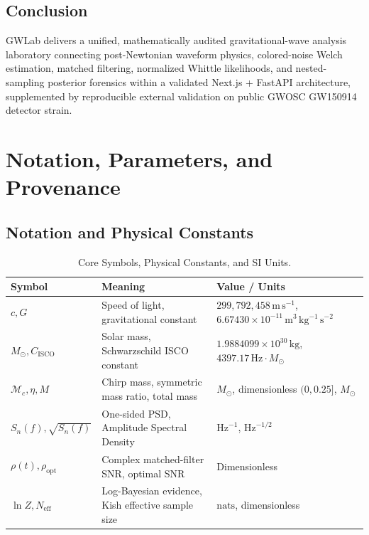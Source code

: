 \documentclass[11pt,a4paper]{report}
\begin{document}
\section{Conclusion}
GWLab delivers a unified, mathematically audited gravitational-wave analysis laboratory connecting post-Newtonian waveform physics, colored-noise Welch estimation, matched filtering, normalized Whittle likelihoods, and nested-sampling posterior forensics within a validated Next.js + FastAPI architecture, supplemented by reproducible external validation on public GWOSC GW150914 detector strain.

\appendix

\chapter{Notation, Parameters, and Provenance}\label{app:provenance}

\section{Notation and Physical Constants}
\begin{table}[H]
    \centering
    \caption{Core Symbols, Physical Constants, and SI Units.}
    \small
    \begin{tabular}{p{3.0cm}p{5.0cm}p{6.8cm}}
        \toprule
        \textbf{Symbol} & \textbf{Meaning} & \textbf{Value / Units} \\
        \midrule
        $c, G$ & Speed of light, gravitational constant & $299{,}792{,}458\,\mathrm{m\,s^{-1}}$, $6.67430\times 10^{-11}\,\mathrm{m^3\,kg^{-1}\,s^{-2}}$ \\
        $M_\odot, C_{\mathrm{ISCO}}$ & Solar mass, Schwarzschild ISCO constant & $1.9884099\times 10^{30}\,\mathrm{kg}$, $4397.17\,\mathrm{Hz}\cdot M_\odot$ \\
        $\mathcal{M}_c, \eta, M$ & Chirp mass, symmetric mass ratio, total mass & $M_\odot$, dimensionless $(0, 0.25]$, $M_\odot$ \\
        $S_n(f), \sqrt{S_n(f)}$ & One-sided PSD, Amplitude Spectral Density & $\mathrm{Hz}^{-1}$, $\mathrm{Hz}^{-1/2}$ \\
        $\rho(t), \rho_{\mathrm{opt}}$ & Complex matched-filter SNR, optimal SNR & Dimensionless \\
        $\ln Z, N_{\mathrm{eff}}$ & Log-Bayesian evidence, Kish effective sample size & $\mathrm{nats}$, dimensionless \\
        \bottomrule
    \end{tabular}
\end{table}
\end{document}
